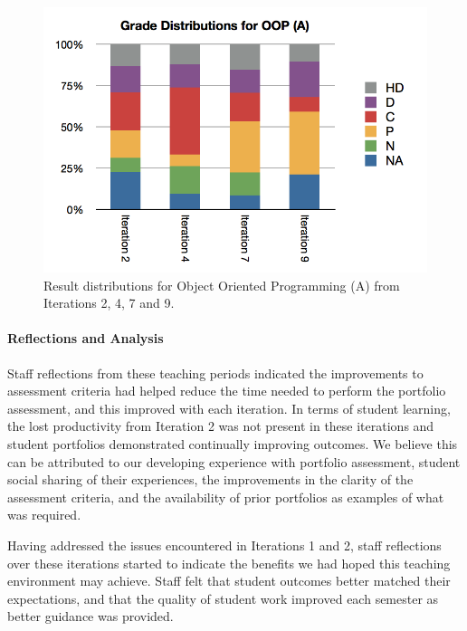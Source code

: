 \begin{figure}[htbp]
  \centering
  \includegraphics[width=0.8\columnwidth]{OOPA}
  \caption{Result distributions for Object Oriented Programming (A) from Iterations 2, 4, 7 and 9.}
  \label{fig:oop_1_9}
\end{figure}



\paragraph{Reflections and Analysis} %

Staff reflections from these teaching periods indicated the improvements to assessment criteria had helped reduce the time needed to perform the portfolio assessment, and this improved with each iteration. In terms of student learning, the lost productivity from Iteration 2 was not present in these iterations and student portfolios demonstrated continually improving outcomes. We believe this can be attributed to our developing experience with portfolio assessment, student social sharing of their experiences, the improvements in the clarity of the assessment criteria, and the availability of prior portfolios as examples of what was required.

Having addressed the issues encountered in Iterations 1 and 2, staff reflections over these iterations started to indicate the benefits we had hoped this teaching environment may achieve. Staff felt that student outcomes better matched their expectations, and that the quality of student work improved each semester as better guidance was provided. 

